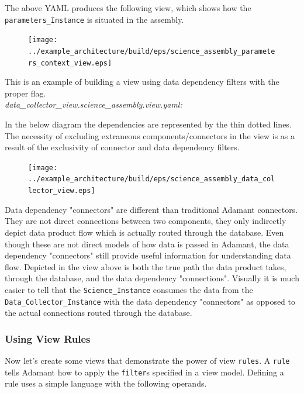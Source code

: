 The above YAML produces the following view, which shows how the \texttt{parameters\_Instance} is situated in the assembly.

\begin{figure}[H]
  \texttt{[image: ../example\_architecture/build/eps/science\_assembly\_parameters\_context\_view.eps]}
\end{figure}

This is an example of building a view using data dependency filters with the proper flag.\\

\textit{data\_collector\_view.science\_assembly.view.yaml:}

In the below diagram the dependencies are represented by the thin dotted lines. The necessity of excluding extraneous components/connectors in the view is as a result of the exclusivity of connector and data dependency filters.

\begin{figure}[H]
  \texttt{[image: ../example\_architecture/build/eps/science\_assembly\_data\_collector\_view.eps]}
\end{figure}

Data dependency "connectors" are different than traditional Adamant connectors. They are not direct connections between two components, they only indirectly depict data product flow which is actually routed through the database. Even though these are not direct models of how data is passed in Adamant, the data dependency "connectors" still provide useful information for understanding data flow. Depicted in the view above is both the true path the data product takes, through the database, and the data dependency "connections". Visually it is much easier to tell that the \texttt{Science\_Instance} consumes the data from the \texttt{Data\_Collector\_Instance} with the data dependency "connectors" as opposed to the actual connections routed through the database.

\subsubsection{Using View Rules} \label{Using View Rules}

Now let's create some views that demonstrate the power of view \texttt{rules}. A \texttt{rule} tells Adamant how to apply the \texttt{filter}s specified in a view model. Defining a rule uses a simple language with the following operands.

